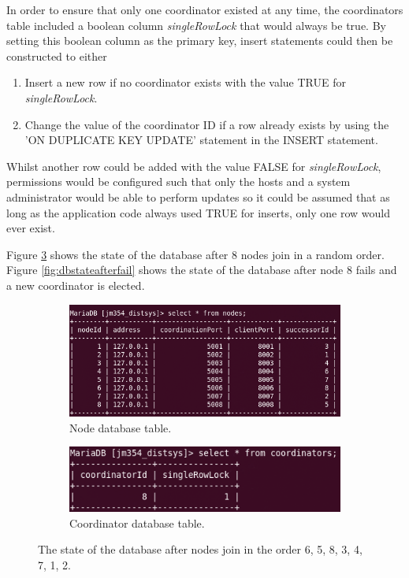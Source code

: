 \documentclass[12pt]{article}
\begin{document}
In order to ensure that only one coordinator existed at any time, the coordinators table included a boolean column \emph{singleRowLock} that would always be true. By setting this boolean column as the primary key, insert statements could then be constructed to either 
\begin{enumerate}
	\item Insert a new row if no coordinator exists with the value TRUE for \emph{singleRowLock}.
	\item Change the value of the coordinator ID if a row already exists by using the 'ON DUPLICATE KEY UPDATE' statement in the INSERT statement.
\end{enumerate}

Whilst another row could be added with the value FALSE for \emph{singleRowLock}, permissions would be configured such that only the hosts and a system administrator would be able to perform updates so it could be assumed that as long as the application code always used TRUE for inserts, only one row would ever exist. 

Figure \ref{fig:dbstate} shows the state of the database after 8 nodes join in a random order. Figure \ref{fig:dbstateafterfail} shows the state of the database after node 8 fails and a new coordinator is elected.

\begin{figure}[!h]
\centering
\begin{subfigure}{.5\textwidth}
  \centering
  \includegraphics[width=0.95\linewidth]{images/fullring}
  \caption{Node database table.}
  \label{fig:nodetable}
\end{subfigure}%
\begin{subfigure}{.5\textwidth}
  \centering
  \includegraphics[width=0.95\linewidth]{images/coord}
  \caption{Coordinator database table.}
  \label{fig:coordtable}
\end{subfigure}
\caption{The state of the database after nodes join in the order 6, 5, 8, 3, 4, 7, 1, 2.}
\label{fig:dbstate}
\end{figure}
\end{document}
